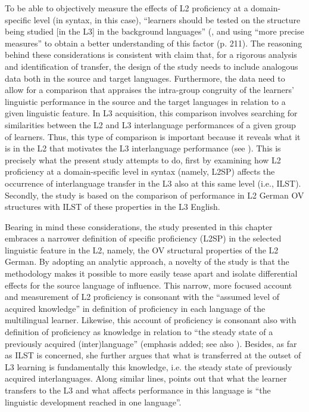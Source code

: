 \documentclass[output=paper,modfonts,nonflat, newtxmath]{langsci/langscibook}
\begin{document}
To be able to objectively measure the effects of L2 proficiency at a domain-specific level (in syntax, in this case), “learners should be tested on the structure being studied [in the L3] in the background languages” (\citet[197]{FalkBardel2010}, and using “more precise measures” to obtain a better understanding of this factor (p. 211). The reasoning behind these considerations is consistent with  claim that, for a rigorous analysis and identification of transfer, the design of the study needs to include analogous data both in the source and target languages. Furthermore, the data need to allow for a comparison that appraises the intra-group congruity of the learners’ linguistic performance in the source and the target languages in relation to a given linguistic feature. In L3 acquisition, this comparison involves searching for similarities between the L2 and L3 interlanguage performances of a given group of learners. Thus, this type of comparison is important because it reveals what it is in the L2 that motivates the L3 interlanguage performance (see \citealt[255]{Jarvis2000}). This is precisely what the present study attempts to do, first by examining how L2 proficiency at a domain-specific level in syntax (namely, L2SP) affects the occurrence of interlanguage transfer in the L3 also at this same level (i.e., ILST). Secondly, the study is based on the comparison of performance in L2 German OV structures with ILST of these properties in the L3 English.

Bearing in mind these considerations, the study presented in this chapter embraces a narrower definition of specific proficiency (L2SP) in the selected linguistic feature in the L2, namely, the OV structural properties of the L2 German. By adopting an analytic approach, a novelty of the study is that the methodology makes it possible to more easily tease apart and isolate differential effects for the source language of influence. This narrow, more focused account and measurement of L2 proficiency is consonant with the “assumed level of acquired knowledge” in  definition of proficiency in each language of the multilingual learner. Likewise, this account of proficiency is consonant also with  definition of proficiency as knowledge in relation to “the steady state of a previously acquired (inter)language” (emphasis added; see also \citealt[40]{Leung2005}). Besides, as far as ILST is concerned, she further argues that what is transferred at the outset of L3 learning is fundamentally this knowledge, i.e. the steady state of previously acquired interlanguages. Along similar lines, \citet[115]{DeAngelis2007} points out that what the learner transfers to the L3 and what affects performance in this language is “the linguistic development reached in one language”.
\end{document}
